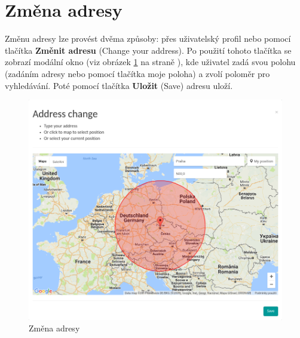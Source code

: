 \section{Změna adresy}

\label{nur:address-change}

Změnu adresy lze provést dvěma způsoby: přes uživatelský profil nebo pomocí tlačítka \textbf{Změnit adresu} (Change your address). Po použití tohoto tlačítka se zobrazí modální okno (viz obrázek \ref{fig:tur:address-change} na straně \pageref{fig:tur:address-change}), kde uživatel zadá svou polohu (zadáním adresy nebo pomocí tlačítka moje poloha) a zvolí poloměr pro vyhledávání. Poté pomocí tlačítka \textbf{Uložit} (Save) adresu uloží.

\begin{figure}[!h]
    \centering
    \includegraphics[width=1.0\textwidth]{media/tur/address-change.png}
    \caption{Změna adresy}
    \label{fig:tur:address-change}
\end{figure}